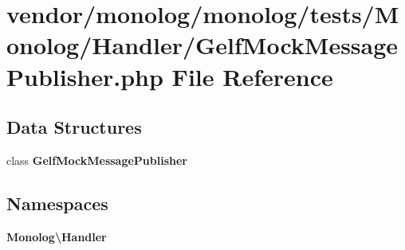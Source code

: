 \section{vendor/monolog/monolog/tests/\+Monolog/\+Handler/\+Gelf\+Mock\+Message\+Publisher.php File Reference}
\label{_gelf_mock_message_publisher_8php}
\subsection*{Data Structures}
\begin{DoxyCompactItemize}
\item 
class {\bf Gelf\+Mock\+Message\+Publisher}
\end{DoxyCompactItemize}
\subsection*{Namespaces}
\begin{DoxyCompactItemize}
\item 
 {\bf Monolog\textbackslash{}\+Handler}
\end{DoxyCompactItemize}
